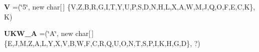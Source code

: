 \begin{DoxyCompactItemize}
\item 
\mbox{\label{enumde_1_1_enigma_1_1_util_1_1_enums_1_1_e_mill_alphabet_aa26fea3741f0c38bf15204bbf0cba51d}} 
{\bfseries V} =(\char`\"{}5\char`\"{}, new char\mbox{[}$\,$\mbox{]} \{\textquotesingle{}V\textquotesingle{},\textquotesingle{}Z\textquotesingle{},\textquotesingle{}B\textquotesingle{},\textquotesingle{}R\textquotesingle{},\textquotesingle{}G\textquotesingle{},\textquotesingle{}I\textquotesingle{},\textquotesingle{}T\textquotesingle{},\textquotesingle{}Y\textquotesingle{},\textquotesingle{}U\textquotesingle{},\textquotesingle{}P\textquotesingle{},\textquotesingle{}S\textquotesingle{},\textquotesingle{}D\textquotesingle{},\textquotesingle{}N\textquotesingle{},\textquotesingle{}H\textquotesingle{},\textquotesingle{}L\textquotesingle{},\textquotesingle{}X\textquotesingle{},\textquotesingle{}A\textquotesingle{},\textquotesingle{}W\textquotesingle{},\textquotesingle{}M\textquotesingle{},\textquotesingle{}J\textquotesingle{},\textquotesingle{}Q\textquotesingle{},\textquotesingle{}O\textquotesingle{},\textquotesingle{}F\textquotesingle{},\textquotesingle{}E\textquotesingle{},\textquotesingle{}C\textquotesingle{},\textquotesingle{}K\textquotesingle{}\}, \textquotesingle{}K\textquotesingle{})
\item 
\mbox{\label{enumde_1_1_enigma_1_1_util_1_1_enums_1_1_e_mill_alphabet_a506fed75dbe1428bfb4f863f4300cf20}} 
{\bfseries U\+K\+W\+\_\+A} =(\char`\"{}A\char`\"{}, new char\mbox{[}$\,$\mbox{]} \{\textquotesingle{}E\textquotesingle{},\textquotesingle{}J\textquotesingle{},\textquotesingle{}M\textquotesingle{},\textquotesingle{}Z\textquotesingle{},\textquotesingle{}A\textquotesingle{},\textquotesingle{}L\textquotesingle{},\textquotesingle{}Y\textquotesingle{},\textquotesingle{}X\textquotesingle{},\textquotesingle{}V\textquotesingle{},\textquotesingle{}B\textquotesingle{},\textquotesingle{}W\textquotesingle{},\textquotesingle{}F\textquotesingle{},\textquotesingle{}C\textquotesingle{},\textquotesingle{}R\textquotesingle{},\textquotesingle{}Q\textquotesingle{},\textquotesingle{}U\textquotesingle{},\textquotesingle{}O\textquotesingle{},\textquotesingle{}N\textquotesingle{},\textquotesingle{}T\textquotesingle{},\textquotesingle{}S\textquotesingle{},\textquotesingle{}P\textquotesingle{},\textquotesingle{}I\textquotesingle{},\textquotesingle{}K\textquotesingle{},\textquotesingle{}H\textquotesingle{},\textquotesingle{}G\textquotesingle{},\textquotesingle{}D\textquotesingle{}\}, \textquotesingle{}?\textquotesingle{})

\end{DoxyCompactItemize}

